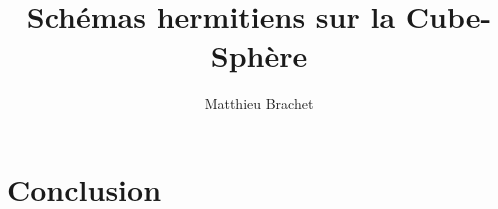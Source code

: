 \documentclass[10pt,a4paper]{amsart}
\title{Schémas hermitiens sur la Cube-Sphère}
\author{Matthieu Brachet}
\begin{document}
\maketitle

\tableofcontents













\section{Conclusion}





\end{document}
